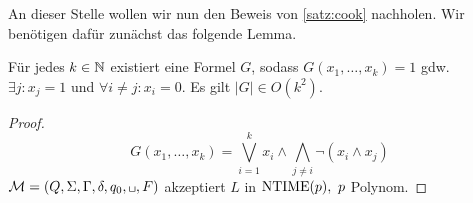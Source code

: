 
An dieser Stelle wollen wir nun den Beweis von \autoref{satz:cook} nachholen.
Wir benötigen dafür zunächst das folgende Lemma.
\begin{lemma}
	Für jedes $k\in\mathbb{N}$ existiert eine Formel $G$, sodass $G(x_1,\dots,x_k)=1$ gdw. $\exists j: x_j = 1$ und $\forall i \neq j: x_i = 0$. Es gilt $|G| \in O(k^2)$.
\end{lemma}
\begin{proof}
	\[ G(x_1,\dots,x_k) = \bigvee_{i=1}^k x_i\land \bigwedge_{j\neq i}\neg (x_i\land x_j) \]
	$\M=(Q,\Sigma,\Gamma,\delta,q_0,\blank,F)$ akzeptiert $L$ in $\operatorname{NTIME}(p),\ p$ Polynom.
\end{proof}

